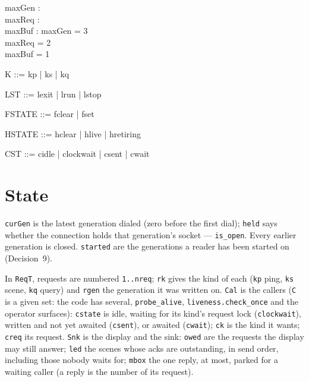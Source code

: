 \documentclass[a4paper,10pt,fleqn]{article}
\begin{document}
\begin{axdef}
  maxGen : \nat \\
  maxReq : \nat \\
  maxBuf : \nat
\where
  maxGen = 3 \\
  maxReq = 2 \\
  maxBuf = 1
\end{axdef}

\begin{zed}
  [T]
\end{zed}

\begin{zed}
  [C]
\end{zed}

\begin{zed}
  K ::= kp | ks | kq
\end{zed}

\begin{zed}
  LST ::= lexit | lrun | lstop
\end{zed}

\begin{zed}
  FSTATE ::= fclear | fset
\end{zed}

\begin{zed}
  HSTATE ::= hclear | hlive | hretiring
\end{zed}

\begin{zed}
  CST ::= cidle | clockwait | csent | cwait
\end{zed}

\section{State}

\texttt{curGen} is the latest generation dialed (zero before the first dial);
\texttt{held} says whether the connection holds that generation's socket ---
\texttt{is\_open}.  Every earlier generation is closed.  \texttt{started} are
the generations a reader has been started on (Decision~9).

In \texttt{ReqT}, requests are numbered \texttt{1..nreq}; \texttt{rk} gives the
kind of each (\texttt{kp} ping, \texttt{ks} scene, \texttt{kq} query) and
\texttt{rgen} the generation it was written on.  \texttt{Cal} is the callers
(\texttt{C} is a given set: the code has several, \texttt{probe\_alive},
\texttt{liveness.check\_once} and the operator surfaces): \texttt{cstate} is
idle, waiting for its kind's request lock (\texttt{clockwait}), written and not
yet awaited (\texttt{csent}), or awaited (\texttt{cwait}); \texttt{ck} is the
kind it wants; \texttt{creq} its request.  \texttt{Snk} is the display and the
sink: \texttt{owed} are the requests the display may still answer; \texttt{led}
the scenes whose acks are outstanding, in send order, including those nobody
waits for; \texttt{mbox} the one reply, at most, parked for a waiting caller
(a reply is the number of its request).
\end{document}
